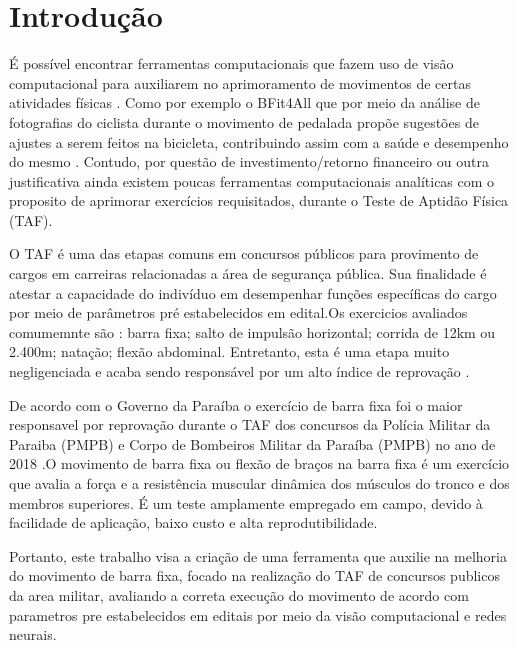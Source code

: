 \chapter{Introdução}

É possível encontrar ferramentas computacionais que fazem uso  de visão computacional para auxiliarem no aprimoramento de movimentos de certas atividades físicas \cite{vcBicicleta} \cite{vcFutebol} \cite{futebolTatica}. Como por exemplo o BFit4All que por meio da análise de fotografias do ciclista durante o movimento de pedalada propõe  sugestões de ajustes a serem feitos na bicicleta, contribuindo assim com a saúde e desempenho do mesmo  \cite{vcBicicleta}. Contudo, por questão de investimento/retorno financeiro ou outra justificativa ainda existem poucas ferramentas computacionais analíticas com o proposito de aprimorar exercícios requisitados, durante o Teste de Aptidão Física (TAF).

O TAF é uma das etapas comuns em concursos públicos para provimento de cargos em carreiras relacionadas a área de segurança pública. Sua finalidade é atestar a capacidade do indivíduo em desempenhar funções específicas do cargo por meio de parâmetros pré estabelecidos em edital.Os exercicios avaliados comumemnte são : barra fixa; salto de impulsão horizontal; corrida de 12km ou 2.400m; natação; flexão abdominal. Entretanto, esta é uma etapa muito negligenciada e acaba sendo responsável por um alto índice de reprovação \cite{reprovaTAF}.


De acordo com o Governo da Paraíba o exercício de barra fixa foi o maior responsavel por reprovação durante o TAF dos concursos  da Polícia Militar da Paraiba (PMPB) e Corpo de Bombeiros Militar da Paraíba (PMPB) no ano de 2018 \cite{barraTAF}.O movimento de barra fixa ou flexão de braços na barra fixa é um exercício que avalia a força e a resistência muscular dinâmica dos músculos do tronco e dos membros superiores. É um teste amplamente empregado em campo, devido à facilidade de aplicação, baixo custo e alta reprodutibilidade\cite{barraFixa}. 



Portanto, este trabalho visa a criação de uma ferramenta que auxilie na melhoria do movimento de barra fixa, focado na realização do TAF de concursos publicos da area militar, avaliando a correta execução do movimento de acordo com parametros pre estabelecidos em editais por meio da visão computacional e redes neurais.

